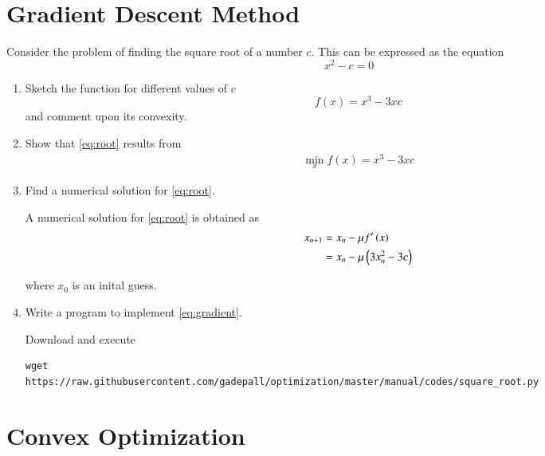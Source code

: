 \documentclass[journal,12pt,twocolumn]{IEEEtran}
\renewcommand\thesection{\arabic{section}}
\begin{document}
\section{Gradient Descent Method}
Consider the problem of finding the square root of a number $c$.  This can be expressed as the equation
%
\begin{equation}
\label{eq:root}
x^2 -c= 0
\end{equation}
%
\begin{enumerate}[label=\thesection.\arabic*,ref=\thesection.\theenumi]

\item
Sketch the function for different values of $c$
%
\begin{equation}
f(x)= x^{3}-3xc
\end{equation}
%
and comment upon its convexity.

\item
Show that \eqref{eq:root} results from
\begin{align}
\min_{x}f(x)= x^{3}-3xc
\end{align}

\item
Find a numerical solution for \eqref{eq:root}.

\solution
A numerical solution for \eqref{eq:root} is obtained as
%
\begin{align}
x_{n+1}&=x_{n}-\mu f^{\prime}\brak{x}
\\
&=x_{n} -\mu \brak{3x_n^{2}-3c}
\label{eq:gradient}
\end{align}

%
where $x_0$ is an inital guess.
%
\item
Write a program to implement \eqref{eq:gradient}.

%
\solution Download and execute
\begin{lstlisting}
wget 
https://raw.githubusercontent.com/gadepall/optimization/master/manual/codes/square_root.py
\end{lstlisting}
\end{enumerate}

\section{Convex Optimization}
\end{document}
